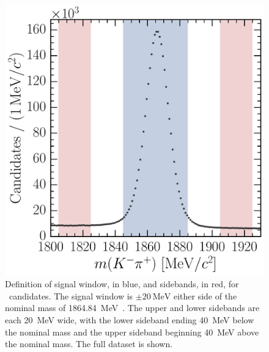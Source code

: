 \begin{figure}
  \centering
  \includegraphics[width=\textwidth]{figures/production/fitting/D0ToKpi_mass_offline_selection_regions}
  \caption{%
    Definition of signal window, in blue, and sidebands, in red, for \DzToKpi\ 
    candidates.
    The signal window is $\pm\SI{20}{\MeV}$ either side of the nominal \PDzero 
    mass of \SI{1864.84}{\MeV}~\cite{PDG2014}.
    The upper and lower sidebands are each \SI{20}{\MeV} wide, with the lower 
    sideband ending \SI{40}{\MeV} below the nominal \PDzero mass and the upper 
    sideband beginning \SI{40}{\MeV} above the nominal \PDzero mass.
    The full dataset is shown.
  }
  \label{fig:prod:fitting:regions:D0ToKpi}
\end{figure}

